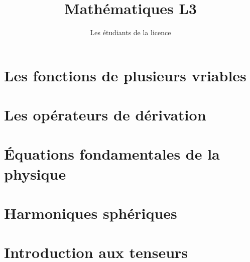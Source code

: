 \documentclass[12pt,fleqn]{book}
\begin{document}
\title{Mathématiques L3}
\author{Les étudiants de la licence}
\maketitle

\chapter{Les fonctions de plusieurs vriables}
\label{cha:les-fonctions-de}

\chapter{Les opérateurs de dérivation}
\label{cha:les-operateurs-de}

\chapter{Équations fondamentales de la physique}
\label{cha:equat-fond-de}

\chapter{Harmoniques sphériques}
\label{cha:harm-spher}

\chapter{Introduction aux tenseurs}
\label{cha:intr-aux-tens}
\end{document}
